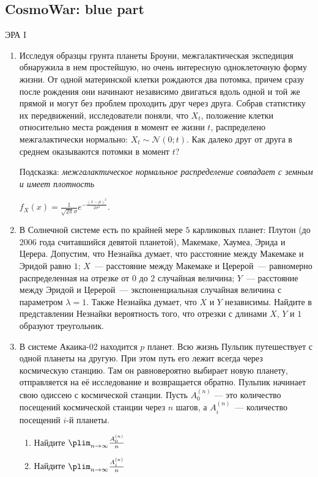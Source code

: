 


\subsection{CosmoWar: blue part}

\begin{center}
ЭРА I
\end{center}

\begin{enumerate}
\item Исследуя образцы грунта планеты Броуни, межгалактическая экспедиция обнаружила в нем простейшую, но очень интересную одноклеточную форму жизни. От одной материнской клетки рождаются два потомка, причем сразу после рождения они начинают независимо двигаться вдоль одной и той же прямой и могут без проблем проходить друг через друга. Собрав статистику их передвижений, исследователи поняли, что $X_t$, положение клетки относительно места рождения в момент ее жизни $t$, распределено межгалактически нормально: $X_t\sim \mathcal{N}(0; t)$. Как далеко друг от друга в среднем оказываются потомки в момент $t$?


Подсказка: \textit{межгалактическое нормальное распределение совпадает с земным и имеет плотность}

$f_X(x) = \frac{1}{\sqrt{2\pi}\sigma}e^{-\frac{(x-\mu)^2}{2\sigma^2}}$.

\item В Солнечной системе есть по крайней мере $5$ карликовых планет: Плутон (до 2006 года считавшийся девятой планетой), Макемаке, Хаумеа, Эрида и Церера. Допустим, что Незнайка думает, что расстояние между Макемаке и Эридой равно $1$;  $X$~--- расстояние между Макемаке и Церерой~--- равномерно распределенная на отрезке от $0$ до $2$ случайная величина; $Y$~--- расстояние между Эридой и Церерой~--- экспоненциальная случайная величина с параметром $\lambda = 1$. Также Незнайка думает, что $X$ и $Y$ независимы. Найдите в представлении Незнайки вероятность того, что отрезки с длинами $X$, $Y$ и $1$ образуют треугольник.

\item  В системе Акаика-02 находится $p$ планет. Всю жизнь Пульпик путешествует с одной планеты на другую. При этом путь его лежит всегда через космическую станцию. Там он равновероятно выбирает новую планету, отправляется на её исследование и возвращается обратно. Пульпик начинает свою одиссею с космической станции. Пусть $A_0^{(n)}$ — это количество посещений космической станции через $n$ шагов, а $A_i^{(n)}$~--- количество посещений $i$-й планеты.

\begin{enumerate}
\item Найдите $\plim_{n \rightarrow \infty} \frac{A_0^{(n)}}{n}$
\item Найдите $\plim_{n \rightarrow \infty} \frac{A_i^{(n)}}{n}$
\end{enumerate}


\end{enumerate}



